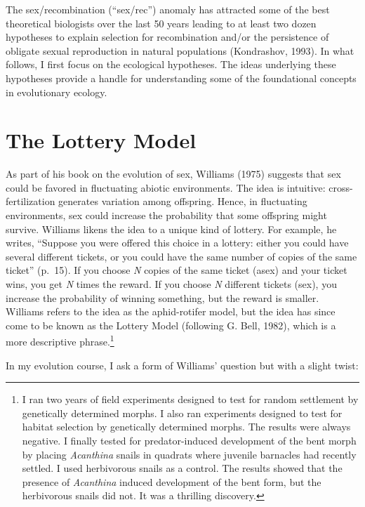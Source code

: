 \documentclass[
  letterpaper,
]{book}
\begin{document}
The sex/recombination (``sex/rec'') anomaly has attracted some of the
best theoretical biologists over the last 50 years leading to at least
two dozen hypotheses to explain selection for recombination and/or the
persistence of obligate sexual reproduction in natural populations
(Kondrashov, 1993). In what follows, I first focus on the ecological
hypotheses. The ideas underlying these hypotheses provide a handle for
understanding some of the foundational concepts in evolutionary ecology.

\hypertarget{the-lottery-model}{%
\section{The Lottery Model}\label{the-lottery-model}}

As part of his book on the evolution of sex, Williams (1975) suggests
that sex could be favored in fluctuating abiotic environments. The idea
is intuitive: cross-fertilization generates variation among offspring.
Hence, in fluctuating environments, sex could increase the probability
that some offspring might survive. Williams likens the idea to a unique
kind of lottery. For example, he writes, ``Suppose you were offered this
choice in a lottery: either you could have several different tickets, or
you could have the same number of copies of the same ticket'' (p.~15).
If you choose \emph{N} copies of the same ticket (asex) and your ticket
wins, you get \emph{N} times the reward. If you choose \emph{N}
different tickets (sex), you increase the probability of winning
something, but the reward is smaller. Williams refers to the idea as the
aphid-rotifer model, but the idea has since come to be known as the
Lottery Model (following G. Bell, 1982), which is a more descriptive
phrase.\footnote{I ran two years of field experiments designed to test
  for random settlement by genetically determined morphs. I also ran
  experiments designed to test for habitat selection by genetically
  determined morphs. The results were always negative. I finally tested
  for predator-induced development of the bent morph by placing
  \emph{Acanthina} snails in quadrats where juvenile barnacles had
  recently settled. I used herbivorous snails as a control. The results
  showed that the presence of \emph{Acanthina} induced development of
  the bent form, but the herbivorous snails did not. It was a thrilling
  discovery.}

In my evolution course, I ask a form of Williams' question but with a
slight twist:
\end{document}
